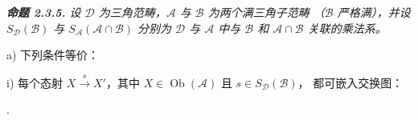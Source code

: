 \begingroup\itshape
{}
\medskip\noindent\textbf{命题 2.3.5.}\quad
{}
设 $\mathcal D$ 为三角范畴，$\mathcal A$ 与 $\mathcal B$ 为两个满三角子范畴
（$\mathcal B$ 严格满），并设 $S_{\mathcal D}(\mathcal B)$ 与
$S_{\mathcal A}(\mathcal A\cap\mathcal B)$ 分别为 $\mathcal D$ 与
$\mathcal A$ 中与 $\mathcal B$ 和 $\mathcal A\cap\mathcal B$ 关联的乘法系。
\par\noindent a) 下列条件等价：
\par\noindent\hspace{1.2em}i) 每个态射 $X\xrightarrow{s}X'$，其中
$X\in\operatorname{Ob}(\mathcal A)$ 且 $s\in S_{\mathcal D}(\mathcal B)$，
都可嵌入交换图：
\begin{center}
 \quad .
\end{center}
\endgroup
\endgroup
